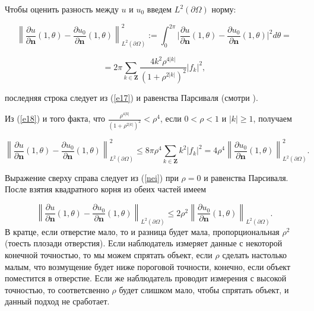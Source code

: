\documentclass[a4paper, 12pt]{article}
\newcommand{\norm}[1]{\left\lVert#1\right\rVert}
\begin{document}
Чтобы оценить разность между $u$ и $u_0$ введем $L^2(\partial \Omega)$ норму:

\begin{equation*}
\norm{\frac{\partial u}{\partial \textbf{n}}(1, \theta) - \frac{\partial u_0}{\partial 
\textbf{n}}(1, \theta)}^{2}_{L^2(\partial \Omega)} :=
\int^{2\pi}_{0}{\lvert \frac{\partial u}{\partial \textbf{n}}(1, \theta) - 
\frac{\partial u_0}{\partial \textbf{n}}(1, \theta) \rvert^2} d\theta =
\end{equation*}

\begin{equation}\label{e18}
= 2\pi \sum_{k \in \textbf{Z}}{\frac{4k^2\rho^{4|k|}}{(1+\rho^{2|k|})^2}|f_k|^2},
\end{equation}

последняя строка следует из (\ref{e17}) и равенства Парсиваля (смотри \cite[стр. 133]
{27}). 

Из (\ref{e18}) и того факта, что $\frac{\rho^{4|k|}}{(1+\rho^{2|k|})^2} < \rho^4$, 
если $0 < \rho < 1$ и $|k| \geq 1$, получаем

\begin{equation*}
\norm{\frac{\partial u}{\partial \textbf{n}}(1, \theta) - \frac{\partial u_0}{\partial 
\textbf{n}}(1, \theta)}^{2}_{L^2(\partial \Omega)} \le 8\pi\rho^4 \sum_{k \in 
\textbf{Z}}{k^2|f_k|^2} = 4\rho^4 \norm{\frac{\partial u_0}{\partial \textbf{n}}(1, 
\theta)}^{2}_{L^2(\partial \Omega)}.
\end{equation*}

Выражение сверху справа следует из (\ref{nei}) при $\rho = 0$ и равенства Парсиваля. 
После взятия квадратного корня из обеих частей имеем

\begin{equation}\label{diff}
\norm{\frac{\partial u}{\partial \textbf{n}}(1, \theta) - \frac{\partial u_0}{\partial 
\textbf{n}}(1, \theta)}_{L^2(\partial \Omega)} \le 2\rho^2 \norm{\frac{\partial u_0}
{\partial \textbf{n}}(1, \theta)}_{L^2(\partial \Omega)}.
\end{equation} 
В кратце, если отверстие мало, то и разница будет мала, пропорциональная $\rho^2$ 
(тоесть плозади отверстия).
Если наблюдатель измеряет данные с некоторой конечной точностью, то мы можем спрятать 
объект, если $\rho$
сделать настолько малым, что возмущение будет ниже пороговой точности, конечно, если 
объект поместится в отверстие. Если же наблюдатель проводит измерения с высокой 
точностью, то соответсвенно $\rho$ будет 
слишком мало, чтобы спрятать объект, и данный подход не сработает.
\end{document}
